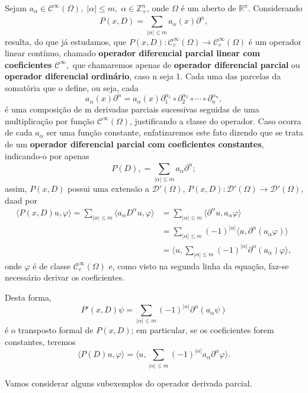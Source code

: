\documentclass[../distribution_theory_notes.tex]{subfiles}
\begin{document}
\begin{example}
	Sejam \(a_{\alpha }\in \mathcal{C}^{\infty}(\Omega ),\; | \alpha  |\leq m,\; \alpha \in \mathbb{Z}_{+}^{n}\), onde \(\Omega \) é um aberto de \(\mathbb{R}^{n}\). Considerando
	\[
		P(x, D)=\sum\limits_{| \alpha  |\leq m}^{}a_{\alpha }(x)\partial^{\alpha },
	\]
	resulta, do que já estudamos, que \(P(x, D):\mathcal{C}_{c}^{\infty}(\Omega )\rightarrow \mathcal{C}_{c}^{\infty}(\Omega )\) é um operador linear contínuo, chamado \textbf{operador diferencial parcial linear com coeficientes} \(\mathcal{C}^{\infty},\) que chamaremos apenas de \textbf{operador diferencial parcial} ou \textbf{operador diferencial ordinário}, caso n seja 1. Cada uma das parcelas da somatória que o define, ou seja, cada
	\[
		a_{\alpha }(x)\partial^{\alpha }=a_{\alpha }(x)\partial_{1}^{\alpha_{1}}\circ \partial_{2}^{\alpha_{2}}\circ\cdots\circ \partial_{n}^{\alpha_{n}},
	\]
	é uma composição de m derivadas parciais sucessivas seguidas de uma multiplicação por função \(\mathcal{C}^{\infty}(\Omega )\), justificando a classe do operador. Caso ocorra de cada \(a_{\alpha }\) ser uma função constante, enfatizaremos este fato dizendo que se trata de um \textbf{operador diferencial parcial com coeficientes constantes}, indicando-o por apenas
	\[
		P(D), = \sum\limits_{| \alpha  |\leq m}^{}a_{\alpha }\partial^{\alpha };
	\]
	assim, \(P(x, D)\) possui uma extensão a \(\mathcal{D}'(\Omega )\), \(P(x, D):\mathcal{D}'(\Omega )\rightarrow \mathcal{D}'(\Omega )\), daad por
	\begin{align*}
		\langle P(x, D)u, \varphi  \rangle = \sum\limits_{| \alpha  |\leq m}^{}\langle a_{\alpha }D^{\alpha }u, \varphi  \rangle & = \sum\limits_{| \alpha  |\leq m}^{}\langle \partial^{\alpha }u, a_{\alpha }\varphi  \rangle                                  \\
		                                                                                                                         & = \sum\limits_{| \alpha  |\leq m}^{}(-1)^{| \alpha  |}\langle u, \partial^{\alpha }(a_{\alpha }\varphi ) \rangle              \\
		                                                                                                                         & = \biggl\langle u, \sum\limits_{| \alpha  |\leq m}^{}(-1)^{| \alpha  |}\partial^{\alpha }(a_{\alpha })\varphi  \biggr\rangle,
	\end{align*}
	onde \(\varphi \) é de classe \(\mathcal{C}_{c}^{\infty}(\Omega )\) e, como visto na segunda linha da equação, faz-se necessário derivar os coeficientes.

	Desta forma,
	\[
		P'(x, D)\psi = \sum\limits_{| \alpha  |\leq m}^{}(-1)^{| \alpha  |}\partial^{\alpha }(a_{\alpha }\psi )
	\]
	é o transposto formal de \(P(x, D)\); em particular, se os coeficientes forem constantes, teremos
	\[
		\langle P(D)u, \varphi  \rangle = \biggl\langle u, \sum\limits_{| \alpha  |\leq m}^{}(-1)^{| \alpha  |}a_{\alpha }\partial^{\alpha }\varphi  \biggr\rangle.
	\]

\end{example}
Vamos considerar alguns subexemplos do operador derivada parcial.
\end{document}
